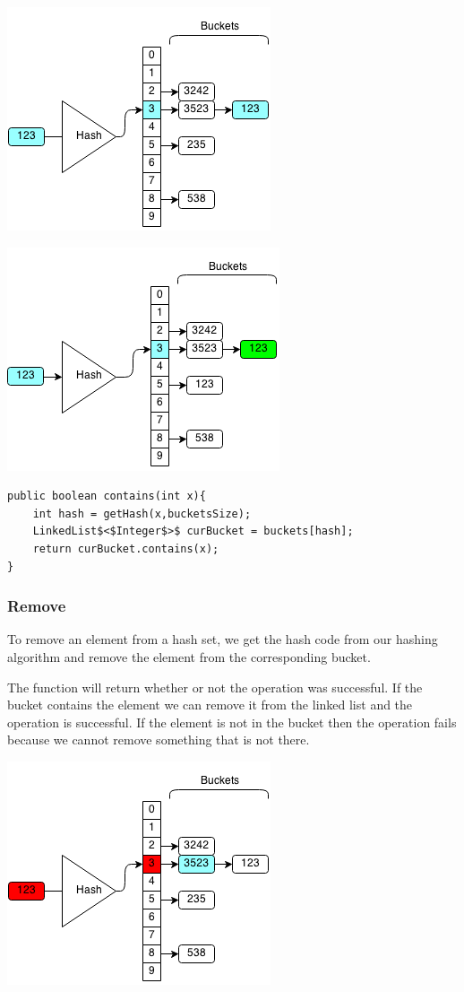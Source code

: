 \documentclass[11pt,oneside]{book}
\makeatletter
\def\maxwidth#1{\ifdim\Gin@nat@width>#1 #1\else\Gin@nat@width\fi}
\makeatother
\begin{document}
\includegraphics[width=\maxwidth{\textwidth}]{hashsetcontains2.png}

\includegraphics[width=\maxwidth{\textwidth}]{hashsetcontains3.png}

\begin{lstlisting}
public boolean contains(int x){
    int hash = getHash(x,bucketsSize);
    LinkedList$<$Integer$>$ curBucket = buckets[hash];
    return curBucket.contains(x);
}
\end{lstlisting}

\subsubsection{Remove}

To remove an element from a hash set, we get the hash code from our hashing algorithm and remove the element from the corresponding bucket.

The function will return whether or not the operation was successful. If the bucket contains the element we can remove it from the linked list and the operation is successful. If the element is not in the bucket then the operation fails because we cannot remove something that is not there.

\includegraphics[width=\maxwidth{\textwidth}]{hashsetrem.png}
\end{document}
